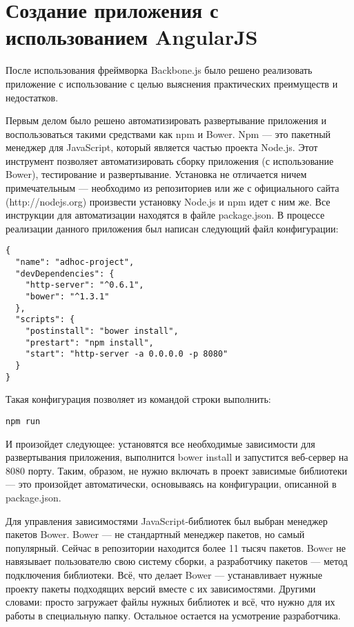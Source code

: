 \section{Создание приложения с использованием AngularJS}

После использования фреймворка Backbone.js было решено реализовать приложение с использование с целью выяснения практических преимуществ и недостатков.

Первым делом было решено автоматизировать развертывание приложения и воспользоваться такими средствами как npm и Bower. Npm --- это пакетный менеджер для JavaScript, который является частью проекта Node.js. Этот инструмент позволяет автоматизировать сборку приложения (с использование Bower), тестирование и развертывание. Установка не отличается ничем примечательным --- необходимо из репозиториев или же с официального сайта (http://nodejs.org) произвести установку Node.js и npm идет с ним же\cite{npm}. Все инструкции для автоматизации находятся в файле package.json. В процессе реализации данного приложения был написан следующий файл конфигурации:
\begin{lstlisting}
{
  "name": "adhoc-project",
  "devDependencies": {
    "http-server": "^0.6.1",
    "bower": "^1.3.1"
  },
  "scripts": {
    "postinstall": "bower install",
    "prestart": "npm install",
    "start": "http-server -a 0.0.0.0 -p 8080"
  }
}
\end{lstlisting}

Такая конфигурация позволяет из командой строки выполнить:
\begin{lstlisting}
npm run
\end{lstlisting}

И произойдет следующее: установятся все необходимые зависимости для развертывания приложения, выполнится bower install и запустится веб-сервер на 8080 порту. Таким, образом, не нужно включать в проект зависимые библиотеки --- это произойдет автоматически, основываясь на конфигурации, описанной в package.json.

Для управления зависимостями JavaScript-библиотек был выбран менеджер пакетов Bower. Bower --- не стандартный менеджер пакетов, но самый популярный. Сейчас в репозитории находится более 11 тысяч пакетов\cite{bower}. Bower не навязывает пользователю свою систему сборки, а разработчику пакетов --- метод подключения библиотеки. Всё, что делает Bower --- устанавливает нужные проекту пакеты подходящих версий вместе с их зависимостями. Другими словами: просто загружает файлы нужных библиотек и всё, что нужно для их работы в специальную папку. Остальное остается на усмотрение разработчика.

